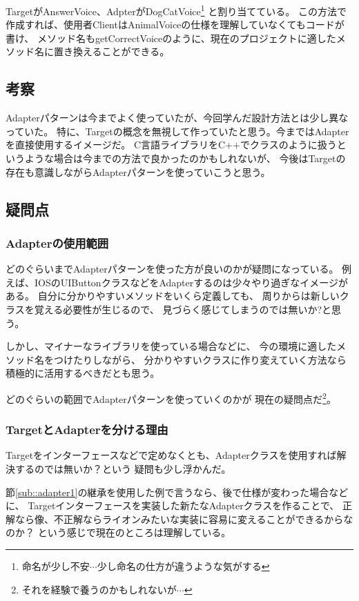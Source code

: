 \documentclass[11pt]{jsarticle}
\begin{document}
			TargetがAnswerVoice、AdpterがDogCatVoice\footnote{命名が少し不安$\cdots$少し命名の仕方が違うような気がする}
			と割り当てている。
			この方法で作成すれば、使用者ClientはAnimalVoiceの仕様を理解していなくてもコードが書け、
			メソッド名もgetCorrectVoiceのように、現在のプロジェクトに適したメソッド名に置き換えることができる。
		
		\subsection{考察}
			Adapterパターンは今までよく使っていたが、今回学んだ設計方法とは少し異なっていた。
			特に、Targetの概念を無視して作っていたと思う。今まではAdapterを直接使用するイメージだ。
			C言語ライブラリをC++でクラスのように扱うというような場合は今までの方法で良かったのかもしれないが、
			今後はTargetの存在も意識しながらAdapterパターンを使っていこうと思う。
			
		\color{red}
		\subsection{疑問点}
			\subsubsection{Adapterの使用範囲}
				どのぐらいまでAdapterパターンを使った方が良いのかが疑問になっている。
				例えば、IOSのUIButtonクラスなどをAdapterするのは少々やり過ぎなイメージがある。
				自分に分かりやすいメソッドをいくら定義しても、
				周りからは新しいクラスを覚える必要性が生じるので、
				見づらく感じてしまうのでは無いか?と思う。
				
				しかし、マイナーなライブラリを使っている場合などに、
				今の環境に適したメソッド名をつけたりしながら、
				分かりやすいクラスに作り変えていく方法なら積極的に活用するべきだとも思う。
				
				どのぐらいの範囲でAdapterパターンを使っていくのかが
				現在の疑問点だ\footnote{それを経験で養うのかもしれないが$\cdots$}。
			\subsubsection{TargetとAdapterを分ける理由}
				Targetをインターフェースなどで定めなくとも、Adapterクラスを使用すれば解決するのでは無いか？という
				疑問も少し浮かんだ。
				
				節\ref{sub::adapter1}の継承を使用した例で言うなら、後で仕様が変わった場合などに、
				Targetインターフェースを実装した新たなAdapterクラスを作ることで、
				正解なら像、不正解ならライオンみたいな実装に容易に変えることができるからなのか？
				という感じで現在のところは理解している。
		\color{black}
		
\end{document}
